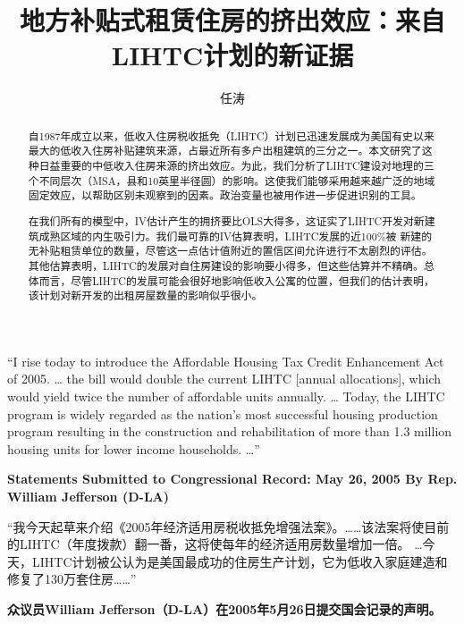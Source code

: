 \documentclass[lang=cn,11pt,a4paper]{elegantpaper}
\title{地方补贴式租赁住房的挤出效应：来自LIHTC计划的新证据}
\author{任\;涛}
\date{\zhtoday}
\begin{document}
\maketitle

\begin{abstract}
  \hspace{2\ccwd}自1987年成立以来，低收入住房税收抵免（LIHTC）计划已迅速发展成为美国有史以来最大的低收入住房补贴建筑来源，占最近所有多户出租建筑的三分之一。本文研究了这种日益重要的中低收入住房来源的挤出效应。为此，我们分析了LIHTC建设对地理的三个不同层次（MSA，县和10英里半径圆）的影响。这使我们能够采用越来越广泛的地域固定效应，以帮助区别未观察到的因素。政治变量也被用作进一步促进识别的工具。
  
  \!在我们所有的模型中，IV估计产生的拥挤要比OLS大得多，这证实了LIHTC开发对新建筑成熟区域的内生吸引力。我们最可靠的IV估算表明，LIHTC发展的近100\%被 新建的无补贴租赁单位的数量，尽管这一点估计值附近的置信区间允许进行不太剧烈的评估。其他估算表明，LIHTC的发展对自住房建设的影响要小得多，但这些估算并不精确。总体而言，尽管LIHTC的发展可能会很好地影响低收入公寓的位置，但我们的估计表明，该计划对新开发的出租房屋数量的影响似乎很小。

\end{abstract}
\vspace{10pt}

\begin{tcolorbox}[
	colback=red!5!white,
  colframe=red!30!black,
  fontupper = \itshape,
]
“I rise today to introduce the Affordable Housing Tax Credit Enhancement Act of 2005. … the bill would double the current LIHTC [annual allocations], which would yield twice the number of affordable units annually. … Today, the LIHTC program is widely regarded as the nation's most successful housing production program resulting in the construction and rehabilitation of more than 1.3 million housing units for lower income households. …”

\textbf{Statements Submitted to Congressional Record: May 26, 2005 By Rep. William Jefferson (D-LA)}
\vspace{5pt}

\tcblower

“我今天起草来介绍《2005年经济适用房税收抵免增强法案》。……该法案将使目前的LIHTC（年度拨款）翻一番，这将使每年的经济适用房数量增加一倍。 …今天，LIHTC计划被公认为是美国最成功的住房生产计划，它为低收入家庭建造和修复了130万套住房……”
\vspace{5pt}

\textbf{众议员William Jefferson（D-LA）在2005年5月26日提交国会记录的声明。}

\end{tcolorbox}
\end{document}
